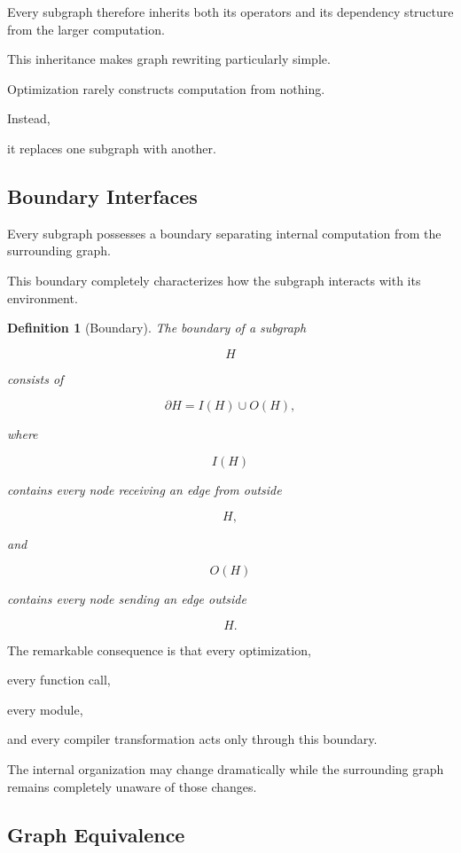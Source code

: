 \documentclass[12pt,oneside]{article}
\newtheorem{definition}{Definition}[section]
\begin{document}
Every subgraph therefore inherits both its operators and its dependency structure from the larger computation.

This inheritance makes graph rewriting particularly simple.

Optimization rarely constructs computation from nothing.

Instead,

it replaces one subgraph with another.

\subsection{Boundary Interfaces}

Every subgraph possesses a boundary separating internal computation from the surrounding graph.

This boundary completely characterizes how the subgraph interacts with its environment.

\begin{definition}[Boundary]

The boundary of a subgraph

\[
H
\]

consists of

\[
\partial H
=
I(H)\cup O(H),
\]

where

\[
I(H)
\]

contains every node receiving an edge from outside

\[
H,
\]

and

\[
O(H)
\]

contains every node sending an edge outside

\[
H.
\]

\end{definition}

The remarkable consequence is that every optimization,

every function call,

every module,

and every compiler transformation acts only through this boundary.

The internal organization may change dramatically while the surrounding graph remains completely unaware of those changes.

\subsection{Graph Equivalence}
\end{document}
